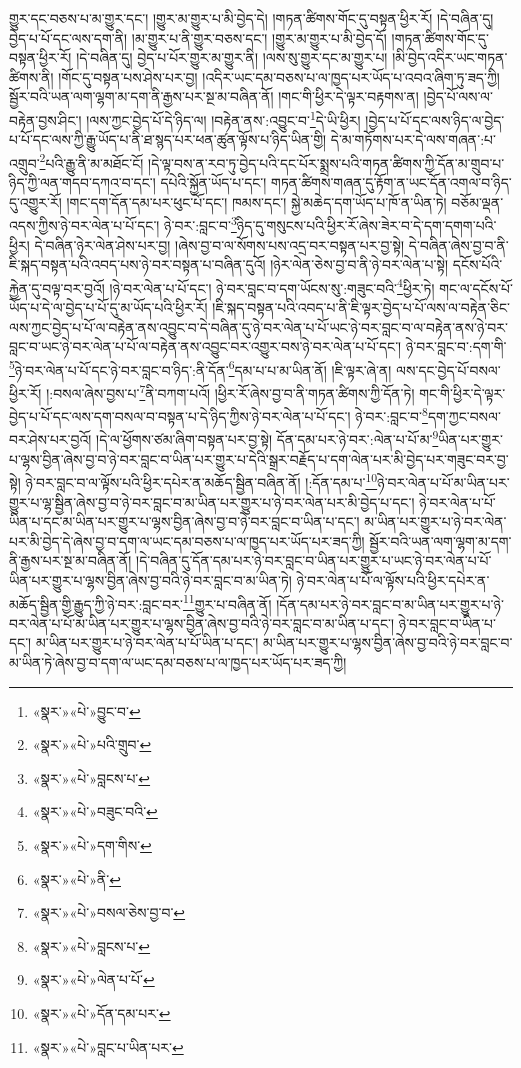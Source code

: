 གྱུར་དང་བཅས་པ་མ་གྱུར་དང་། །གྱུར་མ་གྱུར་པ་མི་བྱེད་དེ། །གཏན་ཚིགས་གོང་དུ་བསྟན་ཕྱིར་རོ། །དེ་བཞིན་དུ། བྱེད་པ་པོ་དང་ལས་དག་ནི། །མ་གྱུར་པ་ནི་གྱུར་བཅས་དང་། །གྱུར་མ་གྱུར་པ་མི་བྱེད་དོ། །གཏན་ཚིགས་གོང་དུ་བསྟན་ཕྱིར་རོ། །དེ་བཞིན་དུ། བྱེད་པ་པོར་གྱུར་མ་གྱུར་ནི། །ལས་སུ་གྱུར་དང་མ་གྱུར་པ། །མི་བྱེད་འདིར་ཡང་གཏན་ཚིགས་ནི། །གོང་དུ་བསྟན་པས་ཤེས་པར་བྱ། །འདིར་ཡང་དམ་བཅས་པ་ལ་ཁྱད་པར་ཡོད་པ་འབའ་ཞིག་ཏུ་ཟད་ཀྱི། སྦྱོར་བའི་ཡན་ལག་ལྷག་མ་དག་ནི་རྒྱས་པར་སྔ་མ་བཞིན་ནོ། །གང་གི་ཕྱིར་དེ་ལྟར་བརྟགས་ན། །བྱེད་པོ་ལས་ལ་བརྟེན་བྱས་ཤིང་། །ལས་ཀྱང་བྱེད་པོ་དེ་ཉིད་ལ། །བརྟེན་ནས་:འབྱུང་བ་\footnote{«སྣར་»«པེ་»བྱུང་བ་}དེ་ཡི་ཕྱིར། །བྱེད་པ་པོ་དང་ལས་ཉིད་ལ་བྱེད་པ་པོ་དང་ལས་ཀྱི་རྒྱུ་ཡོད་པ་ནི་ཐ་སྙད་པར་ཕན་ཚུན་ལྟོས་པ་ཉིད་ཡིན་གྱི། དེ་མ་གཏོགས་པར་དེ་ལས་གཞན་:པ་འགྲུབ་\footnote{«སྣར་»«པེ་»པའི་གྲུབ་}པའི་རྒྱུ་ནི་མ་མཐོང་ངོ། །དེ་ལྟ་བས་ན་རབ་ཏུ་བྱེད་པའི་དང་པོར་སྨྲས་པའི་གཏན་ཚིགས་ཀྱི་དོན་མ་གྲུབ་པ་ཉིད་ཀྱི་ལན་གདབ་དཀའ་བ་དང་། དཔེའི་སྐྱོན་ཡོད་པ་དང་། གཏན་ཚིགས་གཞན་དུ་རྟོག་ན་ཡང་དོན་འགལ་བ་ཉིད་དུ་འགྱུར་རོ། །གང་དག་དོན་དམ་པར་ཕུང་པོ་དང་། ཁམས་དང་། སྐྱེ་མཆེད་དག་ཡོད་པ་ཁོ་ན་ཡིན་ཏེ། བཅོམ་ལྡན་འདས་ཀྱིས་ཉེ་བར་ལེན་པ་པོ་དང་། ཉེ་བར་:བླང་བ་\footnote{«སྣར་»«པེ་»བླངས་པ་}ཉིད་དུ་གསུངས་པའི་ཕྱིར་རོ་ཞེས་ཟེར་བ་དེ་དག་དགག་པའི་ཕྱིར། དེ་བཞིན་ཉེར་ལེན་ཤེས་པར་བྱ། །ཞེས་བྱ་བ་ལ་སོགས་པས་འདྲ་བར་བསྟན་པར་བྱ་སྟེ། དེ་བཞིན་ཞེས་བྱ་བ་ནི་ཇི་སྐད་བསྟན་པའི་འབད་པས་ཉེ་བར་བསྟན་པ་བཞིན་དུའོ། །ཉེར་ལེན་ཅེས་བྱ་བ་ནི་ཉེ་བར་ལེན་པ་སྟེ། དངོས་པོའི་རྐྱེན་དུ་བལྟ་བར་བྱའོ། །ཉེ་བར་ལེན་པ་པོ་དང་། ཉེ་བར་བླང་བ་དག་ཡོངས་སུ་:གཟུང་བའི་\footnote{«སྣར་»«པེ་»བཟུང་བའི་}ཕྱིར་ཏེ། གང་ལ་དངོས་པོ་ཡོད་པ་དེ་ལ་བྱེད་པ་པོ་དུ་མ་ཡོད་པའི་ཕྱིར་རོ། །ཇི་སྐད་བསྟན་པའི་འབད་པ་ནི་ཇི་ལྟར་བྱེད་པ་པོ་ལས་ལ་བརྟེན་ཅིང་ལས་ཀྱང་བྱེད་པ་པོ་ལ་བརྟེན་ནས་འབྱུང་བ་དེ་བཞིན་དུ་ཉེ་བར་ལེན་པ་པོ་ཡང་ཉེ་བར་བླང་བ་ལ་བརྟེན་ནས་ཉེ་བར་བླང་བ་ཡང་ཉེ་བར་ལེན་པ་པོ་ལ་བརྟེན་ནས་འབྱུང་བར་འགྱུར་བས་ཉེ་བར་ལེན་པ་པོ་དང་། ཉེ་བར་བླང་བ་:དག་གི་\footnote{«སྣར་»«པེ་»དག་གིས་}ཉེ་བར་ལེན་པ་པོ་དང་ཉེ་བར་བླང་བ་ཉིད་:ནི་དོན་\footnote{«སྣར་»«པེ་»ནི་}དམ་པ་པ་མ་ཡིན་ནོ། །ཇི་ལྟར་ཞེ་ན། ལས་དང་བྱེད་པོ་བསལ་ཕྱིར་རོ། །:བསལ་ཞེས་བྱས་པ་\footnote{«སྣར་»«པེ་»བསལ་ཅེས་བྱ་བ་}ནི་བཀག་པའོ། །ཕྱིར་རོ་ཞེས་བྱ་བ་ནི་གཏན་ཚིགས་ཀྱི་དོན་ཏེ། གང་གི་ཕྱིར་དེ་ལྟར་བྱེད་པ་པོ་དང་ལས་དག་བསལ་བ་བསྟན་པ་དེ་ཉིད་ཀྱིས་ཉེ་བར་ལེན་པ་པོ་དང་། ཉེ་བར་:བླང་བ་\footnote{«སྣར་»«པེ་»བླངས་པ་}དག་ཀྱང་བསལ་བར་ཤེས་པར་བྱའོ། །དེ་ལ་ཕྱོགས་ཙམ་ཞིག་བསྟན་པར་བྱ་སྟེ། དོན་དམ་པར་ཉེ་བར་:ལེན་པ་པོ་མ་\footnote{«སྣར་»«པེ་»ལེན་པ་པོ་}ཡིན་པར་གྱུར་པ་ལྷས་བྱིན་ཞེས་བྱ་བ་ཉེ་བར་བླང་བ་ཡིན་པར་གྱུར་པ་དེའི་སྒྲར་བརྗོད་པ་དག་ལེན་པར་མི་བྱེད་པར་གཟུང་བར་བྱ་སྟེ། ཉེ་བར་བླང་བ་ལ་ལྟོས་པའི་ཕྱིར་དཔེར་ན་མཆོད་སྦྱིན་བཞིན་ནོ། །:དོན་དམ་པ་\footnote{«སྣར་»«པེ་»དོན་དམ་པར་}ཉེ་བར་ལེན་པ་པོ་མ་ཡིན་པར་གྱུར་པ་ལྷ་སྦྱིན་ཞེས་བྱ་བ་ཉེ་བར་བླང་བ་མ་ཡིན་པར་གྱུར་པ་ཉེ་བར་ལེན་པར་མི་བྱེད་པ་དང་། ཉེ་བར་ལེན་པ་པོ་ཡིན་པ་དང་མ་ཡིན་པར་གྱུར་པ་ལྷས་བྱིན་ཞེས་བྱ་བ་ཉེ་བར་བླང་བ་ཡིན་པ་དང་། མ་ཡིན་པར་གྱུར་པ་ཉེ་བར་ལེན་པར་མི་བྱེད་དེ་ཞེས་བྱ་བ་དག་ལ་ཡང་དམ་བཅས་པ་ལ་ཁྱད་པར་ཡོད་པར་ཟད་ཀྱི། སྦྱོར་བའི་ཡན་ལག་ལྷག་མ་དག་ནི་རྒྱས་པར་སྔ་མ་བཞིན་ནོ། །དེ་བཞིན་དུ་དོན་དམ་པར་ཉེ་བར་བླང་བ་ཡིན་པར་གྱུར་པ་ཡང་ཉེ་བར་ལེན་པ་པོ་ཡིན་པར་གྱུར་པ་ལྷས་བྱིན་ཞེས་བྱ་བའི་ཉེ་བར་བླང་བ་མ་ཡིན་ཏེ། ཉེ་བར་ལེན་པ་པོ་ལ་ལྟོས་པའི་ཕྱིར་དཔེར་ན་མཆོད་སྦྱིན་གྱི་རྒྱུད་ཀྱི་ཉེ་བར་:བླང་བར་\footnote{«སྣར་»«པེ་»བླང་པ་ཡིན་པར་}གྱུར་པ་བཞིན་ནོ། །དོན་དམ་པར་ཉེ་བར་བླང་བ་མ་ཡིན་པར་གྱུར་པ་ཉེ་བར་ལེན་པ་པོ་མ་ཡིན་པར་གྱུར་པ་ལྷས་བྱིན་ཞེས་བྱ་བའི་ཉེ་བར་བླང་བ་མ་ཡིན་པ་དང་། ཉེ་བར་བླང་བ་ཡིན་པ་དང་། མ་ཡིན་པར་གྱུར་པ་ཉེ་བར་ལེན་པ་པོ་ཡིན་པ་དང་། མ་ཡིན་པར་གྱུར་པ་ལྷས་བྱིན་ཞེས་བྱ་བའི་ཉེ་བར་བླང་བ་མ་ཡིན་ཏེ་ཞེས་བྱ་བ་དག་ལ་ཡང་དམ་བཅས་པ་ལ་ཁྱད་པར་ཡོད་པར་ཟད་ཀྱི། 